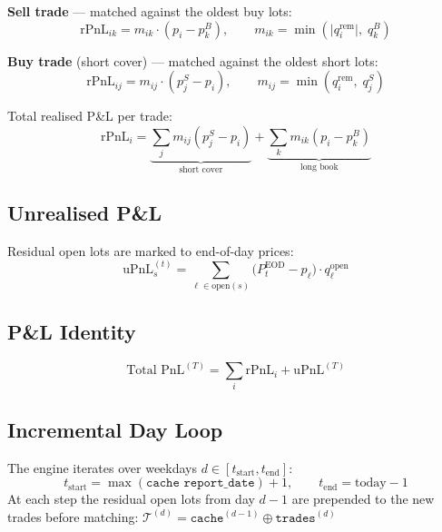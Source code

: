 \documentclass[11pt, a4paper]{article}
\begin{document}
\medskip
\textbf{Sell trade} — matched against the oldest buy lots:
\begin{equation}
  \text{rPnL}_{ik} = m_{ik} \cdot (p_i - p_k^{B}),
  \qquad m_{ik} = \min(\lvert q_i^{\text{rem}}\rvert,\; q_k^{B})
\end{equation}

\textbf{Buy trade} (short cover) — matched against the oldest short lots:
\begin{equation}
  \text{rPnL}_{ij} = m_{ij} \cdot (p_j^{S} - p_i),
  \qquad m_{ij} = \min(q_i^{\text{rem}},\; q_j^{S})
\end{equation}

Total realised P\&L per trade:
\begin{equation}
  \text{rPnL}_i
  = \underbrace{\sum_j m_{ij}(p_j^S - p_i)}_{\text{short cover}}
  + \underbrace{\sum_k m_{ik}(p_i - p_k^B)}_{\text{long book}}
\end{equation}

\subsection{Unrealised P\&L}

Residual open lots are marked to end-of-day prices:
\begin{equation}
  \text{uPnL}_s^{(t)}
  = \sum_{\ell \in \text{open}(s)}
    \bigl(P_t^{\text{EOD}} - p_\ell\bigr)\cdot q_\ell^{\text{open}}
\end{equation}

\subsection{P\&L Identity}

\begin{equation}
  \text{Total PnL}^{(T)}
  = \sum_i \text{rPnL}_i + \text{uPnL}^{(T)}
\end{equation}

\subsection{Incremental Day Loop}

The engine iterates over weekdays $d \in [t_{\text{start}}, t_{\text{end}}]$:
\begin{equation}
  t_{\text{start}} = \max(\texttt{cache report\_date}) + 1,
  \qquad
  t_{\text{end}} = \text{today} - 1
\end{equation}
At each step the residual open lots from day $d{-}1$ are prepended to
the new trades before matching:
$\mathcal{T}^{(d)} = \texttt{cache}^{(d-1)} \oplus \texttt{trades}^{(d)}$
\end{document}
